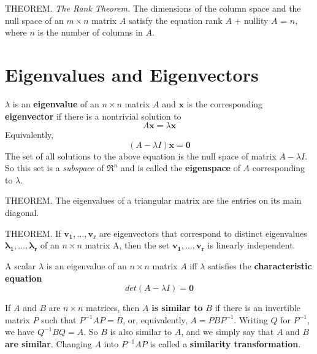 \documentclass{article}
\begin{document}
\hfill \newline THEOREM. \textit{The Rank Theorem.} The dimensions of the column space and the null space of an $m \times n$ matrix $A$ satisfy the equation rank $A$ + nullity $A$ = $n$, where $n$ is the number of columns in $A$.








\section{Eigenvalues and Eigenvectors}

$\lambda$ is an \textbf{eigenvalue} of an $n \times n$ matrix $A$ and  \(\textbf{x}\) is the corresponding \textbf{eigenvector} if there is a nontrivial solution to 
\begin{equation}
    A \textbf{x} = \lambda \textbf{x}
\end{equation}
Equivalently, 
\begin{equation}
    (A-\lambda I)\mathbf{x} = \mathbf{0}
\end{equation}
The set of all solutions to the above equation is the null space of matrix $A-\lambda I$. So this set is a \textit{subspace} of $\Re^n$ and is called the \textbf{eigenspace} of $A$ corresponding to $\lambda$.

\hfill \newline THEOREM. The eigenvalues of a triangular matrix are the entries on its main diagonal.

\hfill \newline THEOREM. If $\mathbf{v_1},\dots,\mathbf{v_r}$ are eigenvectors that correspond to distinct eigenvalues $\mathbf{\lambda_1},\dots,\mathbf{\lambda_r}$ of an $n \times n$ matrix A, then the set {$\mathbf{v_1},\dots,\mathbf{v_r}$} is linearly independent.

\hfill \newline A scalar $\lambda$ is an eigenvalue of an $n \times n$ matrix $A$ iff $\lambda$ satisfies the \textbf{characteristic equation}
\begin{equation}
    det(A-\lambda I) = \mathbf{0}
\end{equation}

\hfill \newline If $A$ and $B$ are $n \times n$ matrices, then $A$ \textbf{is similar to} $B$ if there is an invertible matrix $P$ such that $P^{-1}AP=B$, or, equivalently, $A = PBP^{-1}$. Writing $Q$ for $P^{-1}$, we have $Q^{-1}BQ=A$. So $B$ is also similar to $A$, and we simply say that $A$ and $B$ \textbf{are similar}. Changing $A$ into $P^{-1}AP$ is called a \textbf{similarity transformation}.
\end{document}
